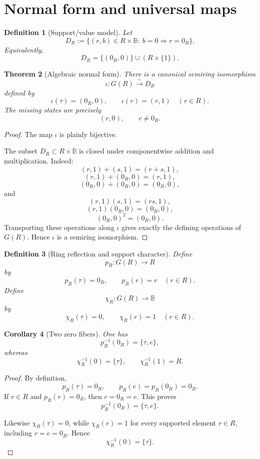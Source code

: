 \documentclass[11pt]{article}
\newtheorem{theorem}{Theorem}[section]
\newtheorem{corollary}[theorem]{Corollary}
\newtheorem{definition}[theorem]{Definition}
\newcommand{\BB}{\mathbb B}
\begin{document}
\section{Normal form and universal maps}

\begin{definition}[Support/value model]
Let
\[
D_R:=\{(r,b)\in R\times\BB:\ b=0\Rightarrow r=0_R\}.
\]
Equivalently,
\[
D_R=\{(0_R,0)\}\cup (R\times\{1\}).
\]
\end{definition}

\begin{theorem}[Algebraic normal form]
There is a canonical semiring isomorphism
\[
\iota:G(R)\xrightarrow{\sim}D_R
\]
defined by
\[
\iota(\tau)=(0_R,0),\qquad \iota(r)=(r,1)\quad(r\in R).
\]
The missing states are precisely
\[
(r,0),\qquad r\neq0_R.
\]
\end{theorem}

\begin{proof}
The map \(\iota\) is plainly bijective.

The subset \(D_R\subset R\times\BB\) is closed under componentwise addition and multiplication. Indeed:
\[
(r,1)+(s,1)=(r+s,1),
\]
\[
(r,1)+(0_R,0)=(r,1),
\]
\[
(0_R,0)+(0_R,0)=(0_R,0),
\]
and
\[
(r,1)(s,1)=(rs,1),
\]
\[
(r,1)(0_R,0)=(0_R,0),
\]
\[
(0_R,0)^2=(0_R,0).
\]
Transporting these operations along \(\iota\) gives exactly the defining operations of \(G(R)\). Hence \(\iota\) is a semiring isomorphism.
\end{proof}

\begin{definition}[Ring reflection and support character]
Define
\[
p_R:G(R)\to R
\]
by
\[
p_R(\tau)=0_R,\qquad p_R(r)=r\quad(r\in R).
\]
Define
\[
\chi_R:G(R)\to\BB
\]
by
\[
\chi_R(\tau)=0,\qquad \chi_R(r)=1\quad(r\in R).
\]
\end{definition}

\begin{corollary}[Two zero fibers]
One has
\[
p_R^{-1}(0_R)=\{\tau,e\},
\]
whereas
\[
\chi_R^{-1}(0)=\{\tau\},
\qquad
\chi_R^{-1}(1)=R.
\]
\end{corollary}

\begin{proof}
By definition,
\[
p_R(\tau)=0_R,\qquad p_R(e)=p_R(0_R)=0_R.
\]
If \(r\in R\) and \(p_R(r)=0_R\), then \(r=0_R=e\). This proves
\[
p_R^{-1}(0_R)=\{\tau,e\}.
\]

Likewise \(\chi_R(\tau)=0\), while \(\chi_R(r)=1\) for every supported element \(r\in R\), including \(r=e=0_R\). Hence
\[
\chi_R^{-1}(0)=\{\tau\}.
\]
\end{proof}
\end{document}
